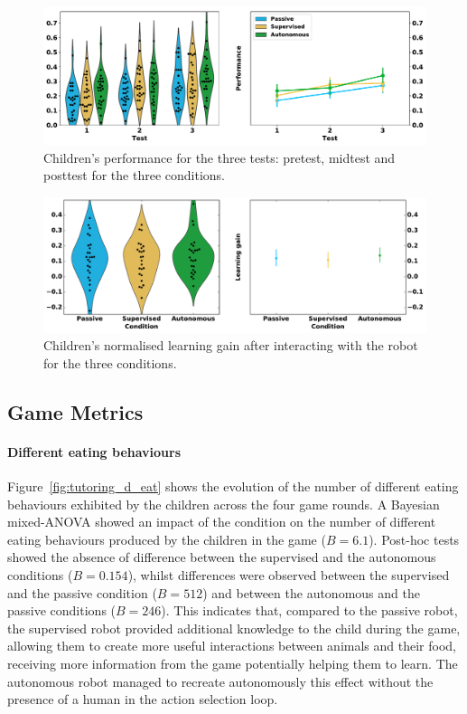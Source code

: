 \begin{figure}[ht]
	\includegraphics[width=1\linewidth]{perf.pdf}
	\centering
	\caption{Children's performance for the three tests: pretest, midtest and posttest for the three conditions.}
	\label{fig:tutoring_performance}
\end{figure}

\begin{figure}[ht]
	\includegraphics[width=1\linewidth]{learning.pdf}
	\centering
	\caption{Children's normalised learning gain after interacting with the robot for the three conditions.}
	\label{fig:tutoring_learning}
\end{figure}

\subsection{Game Metrics}

\paragraph{Different eating behaviours}
Figure~\ref{fig:tutoring_d_eat} shows the evolution of the number of different eating behaviours exhibited by the children across the four game rounds. A Bayesian mixed-ANOVA showed an impact of the condition on the number of different eating behaviours produced by the children in the game ($B=6.1$). Post-hoc tests showed the absence of difference between the supervised and the autonomous conditions ($B=0.154$), whilst differences were observed between the supervised and the passive condition ($B=512$) and between the autonomous and the passive conditions ($B=246$). This indicates that, compared to the passive robot, the supervised robot provided additional knowledge to the child during the game, allowing them to create more useful interactions between animals and their food, receiving more information from the game potentially helping them to learn. The autonomous robot managed to recreate autonomously this effect without the presence of a human in the action selection loop.

